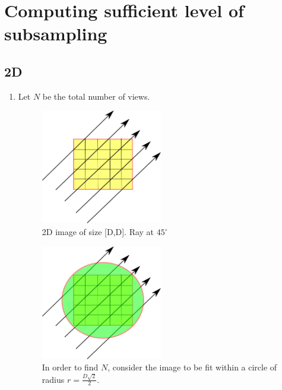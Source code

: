 \documentclass{article}
\begin{document}
\section{Computing sufficient level of subsampling}

\subsection{2D}

\begin{enumerate}
\item Let $N$ be the total number of views. 
\begin{figure}[!h]
\centering
	\includegraphics[width=0.5\textwidth]{../images/notes_1.png}
        \caption{2D image of size [D,D]. Ray at $45^\circ$}
 \label{fig:prior_overview}
\end{figure}


\begin{figure}[!h]
\centering
	\includegraphics[width=0.5\textwidth]{../images/notes_2.png}
        \caption{In order to find $N$, consider the image to be fit within a circle of radius $r = \frac{D\sqrt2}{2}$. }
 \label{fig:prior_overview}
\end{figure}



\end{enumerate}
\end{document}
